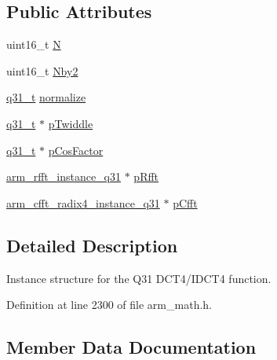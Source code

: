 \subsection*{Public Attributes}
\begin{DoxyCompactItemize}
\item 
uint16\+\_\+t \hyperlink{structarm__dct4__instance__q31_a46a9f136457350676e2bfd3768ff9d6d}{N}
\item 
uint16\+\_\+t \hyperlink{structarm__dct4__instance__q31_a32d3268ba4629908dba056599f0a904d}{Nby2}
\item 
\hyperlink{arm__math_8h_adc89a3547f5324b7b3b95adec3806bc0}{q31\+\_\+t} \hyperlink{structarm__dct4__instance__q31_ac80ff7b28fca36aeef74dea12e8312dd}{normalize}
\item 
\hyperlink{arm__math_8h_adc89a3547f5324b7b3b95adec3806bc0}{q31\+\_\+t} $\ast$ \hyperlink{structarm__dct4__instance__q31_a7db236e22673146bb1d2c962f0713f08}{p\+Twiddle}
\item 
\hyperlink{arm__math_8h_adc89a3547f5324b7b3b95adec3806bc0}{q31\+\_\+t} $\ast$ \hyperlink{structarm__dct4__instance__q31_af97204d1838925621fc82021a0c2d6c1}{p\+Cos\+Factor}
\item 
\hyperlink{structarm__rfft__instance__q31}{arm\+\_\+rfft\+\_\+instance\+\_\+q31} $\ast$ \hyperlink{structarm__dct4__instance__q31_af1487dab5e7963b85dc0fdc6bf492542}{p\+Rfft}
\item 
\hyperlink{structarm__cfft__radix4__instance__q31}{arm\+\_\+cfft\+\_\+radix4\+\_\+instance\+\_\+q31} $\ast$ \hyperlink{structarm__dct4__instance__q31_ac96579cfb28d08bb11dd2fe4c6303833}{p\+Cfft}
\end{DoxyCompactItemize}


\subsection{Detailed Description}
Instance structure for the Q31 D\+C\+T4/\+I\+D\+C\+T4 function. 

Definition at line 2300 of file arm\+\_\+math.\+h.



\subsection{Member Data Documentation}
\mbox{\label{structarm__dct4__instance__q31_a46a9f136457350676e2bfd3768ff9d6d}} 
